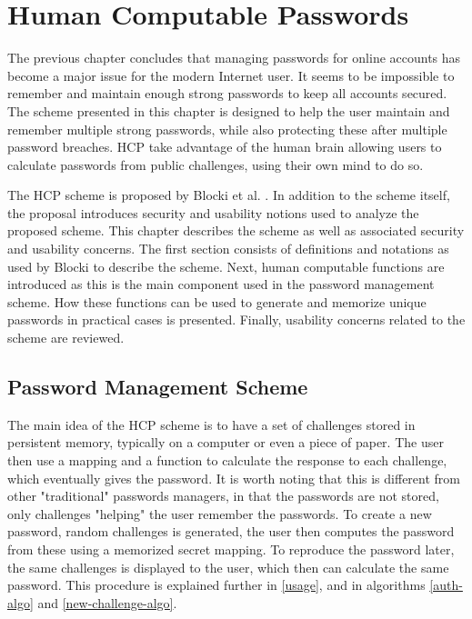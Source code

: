 \chapter{Human Computable Passwords}\label{ch:hcp}
The previous chapter concludes that managing passwords for online accounts has become a major issue for the modern Internet user. It seems to be impossible to remember and maintain enough strong passwords to keep all accounts secured. The scheme presented in this chapter is designed to help the user maintain and remember multiple strong passwords, while also protecting these after multiple password breaches. HCP take advantage of the human brain allowing users to calculate passwords from public challenges, using their own mind to do so. 

\par The HCP scheme is proposed by Blocki et al. \cite{hcp-blocki}. In addition to the scheme itself, the proposal introduces security and usability notions used to analyze the proposed scheme. This chapter describes the scheme as well as associated security and usability concerns. The first section consists of definitions and notations as used by Blocki \cite{hcp-blocki} to describe the scheme. Next, human computable functions are introduced as this is the main component used in the password management scheme. How these functions can be used to generate and memorize unique passwords in practical cases is presented. Finally, usability concerns related to the scheme are reviewed.

\section{Password Management Scheme}
The main idea of the HCP scheme is to have a set of challenges stored in persistent memory, typically on a computer or even a piece of paper. The user then use a mapping and a function to calculate the response to each challenge, which eventually gives the password. It is worth noting that this is different from other "traditional" passwords managers, in that the passwords are not stored, only challenges "helping" the user remember the passwords. To create a new password, random challenges is generated, the user then computes the password from these using a memorized secret mapping. To reproduce the password later, the same challenges is displayed to the user, which then can calculate the same password. This procedure is explained further in \autoref{usage}, and in algorithms \ref{auth-algo} and \ref{new-challenge-algo}.

